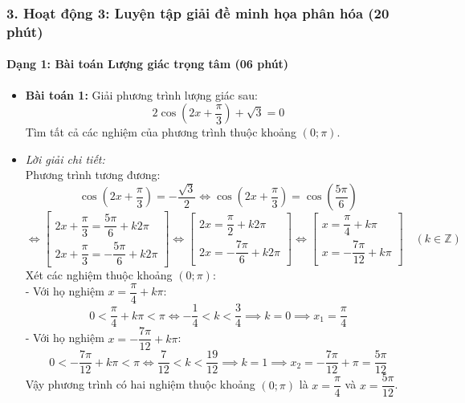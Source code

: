 \documentclass[12pt, a4paper]{article}
\begin{document}
\subsubsection*{3. Hoạt động 3: Luyện tập giải đề minh họa phân hóa (20 phút)}

\paragraph{Dạng 1: Bài toán Lượng giác trọng tâm (06 phút)}
\begin{itemize}
    \item \textbf{Bài toán 1:} Giải phương trình lượng giác sau:
    $$2\cos\left(2x + \dfrac{\pi}{3}\right) + \sqrt{3} = 0$$
    Tìm tất cả các nghiệm của phương trình thuộc khoảng $(0; \pi)$.
    \item \textit{Lời giải chi tiết:}\\
    Phương trình tương đương:
    $$\cos\left(2x + \dfrac{\pi}{3}\right) = -\dfrac{\sqrt{3}}{2} \iff \cos\left(2x + \dfrac{\pi}{3}\right) = \cos\left(\dfrac{5\pi}{6}\right)$$
    $$\iff \begin{bmatrix} 2x + \dfrac{\pi}{3} = \dfrac{5\pi}{6} + k2\pi \\ 2x + \dfrac{\pi}{3} = -\dfrac{5\pi}{6} + k2\pi \end{bmatrix} \iff \begin{bmatrix} 2x = \dfrac{\pi}{2} + k2\pi \\ 2x = -\dfrac{7\pi}{6} + k2\pi \end{bmatrix} \iff \begin{bmatrix} x = \dfrac{\pi}{4} + k\pi \\ x = -\dfrac{7\pi}{12} + k\pi \end{bmatrix} \quad (k \in \mathbb{Z})$$
    Xét các nghiệm thuộc khoảng $(0; \pi)$:\\
    - Với họ nghiệm $x = \dfrac{\pi}{4} + k\pi$:
    $$0 < \dfrac{\pi}{4} + k\pi < \pi \iff -\dfrac{1}{4} < k < \dfrac{3}{4} \implies k = 0 \implies x_1 = \dfrac{\pi}{4}$$
    - Với họ nghiệm $x = -\dfrac{7\pi}{12} + k\pi$:
    $$0 < -\dfrac{7\pi}{12} + k\pi < \pi \iff \dfrac{7}{12} < k < \dfrac{19}{12} \implies k = 1 \implies x_2 = -\dfrac{7\pi}{12} + \pi = \dfrac{5\pi}{12}$$
    Vậy phương trình có hai nghiệm thuộc khoảng $(0; \pi)$ là $x = \dfrac{\pi}{4}$ và $x = \dfrac{5\pi}{12}$.
\end{itemize}
\end{document}

